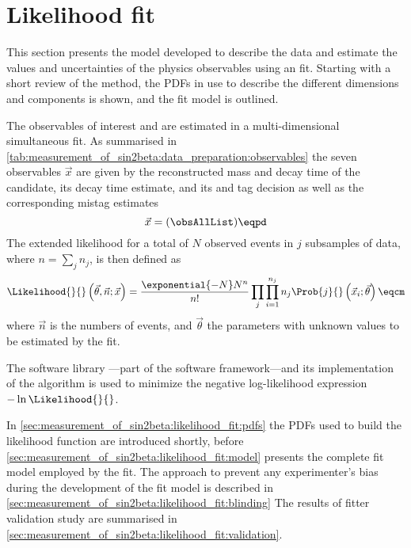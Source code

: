 
\section{Likelihood fit}
\label{sec:measurement_of_sin2beta:likelihood_fit}

This section presents the model developed to describe the data and estimate the
values and uncertainties of the physics observables using an \uEML fit. Starting
with a short review of the \uEML method, the \acp{PDF} in use to describe the
different dimensions and components is shown, and the fit model is outlined.

The \CP observables of interest \SJpsiKS and \CJpsiKS are estimated in a
multi-dimensional simultaneous \uEML fit. As summarised in
\cref{tab:measurement_of_sin2beta:data_preparation:observables} the seven
observables $\vec{x}$ are given by the reconstructed mass and decay time of the
\Bd candidate, its decay time estimate, and its \OS and \SSpi tag decision as
well as the corresponding mistag estimates
%
\begin{equation}\label{eq:measurement_of_sin2beta:likelihood_fit:observables}
  \vec{x} = (\obsAllList)\eqpd  
\end{equation}
%
The extended likelihood for a total of $N$ observed events in $j$ subsamples of
data, where $n=\sum_j n_j$, is then defined as
%
\begin{equation}\label{eq:measurement_of_sin2beta:likelihood_fit:uEML}
  \Likelihood{}{}\left(\vec{\theta},\vec{n};\vec{x}\right) = \frac{\exponential{-N} N^n}{n!} \prod_j \prod_{i=1}^{n_j} n_j \Prob{j}{}\left(\vec{x}_i;\vec{\theta}\right)\eqcm
\end{equation}
%
where $\vec{n}$ is the numbers of events, and $\vec{\theta}$ the parameters with
unknown values to be estimated by the \uEML fit. 

The software library \RooFit---part of the \ROOT software framework---and its
implementation of the \Minuit algorithm is used to minimize the negative
log-likelihood expression $-\ln\Likelihood{}{}$.

In \cref{sec:measurement_of_sin2beta:likelihood_fit:pdfs} the \acp{PDF} used to
build the likelihood function are introduced shortly, before
\cref{sec:measurement_of_sin2beta:likelihood_fit:model} presents the complete
fit model employed by the \uEML fit. The approach to prevent any experimenter's
bias during the development of the fit model is described in
\cref{sec:measurement_of_sin2beta:likelihood_fit:blinding} The results of fitter
validation study are summarised in
\cref{sec:measurement_of_sin2beta:likelihood_fit:validation}.

